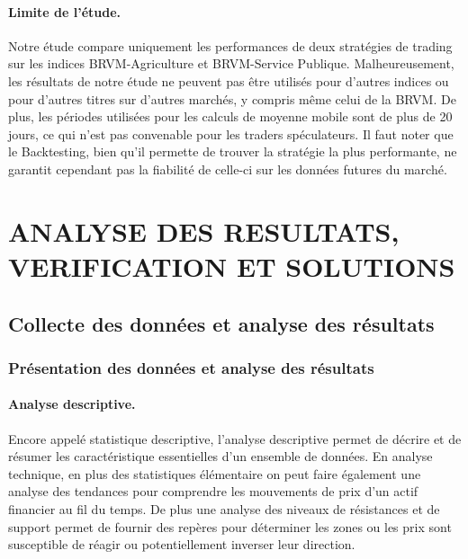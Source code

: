 \paragraph{\texorpdfstring{Limite de l'étude.
}{Limite de l'étude. }}\label{limite-de-luxe9tude.}

{Notre étude compare uniquement les performances de deux stratégies de
trading sur les indices BRVM-Agriculture et BRVM-Service Publique.
Malheureusement, les résultats de notre étude ne peuvent pas être
utilisés pour d'autres indices ou pour d'autres titres sur d'autres
marchés, y compris même celui de la BRVM. De plus, les périodes
utilisées pour les calculs de moyenne mobile sont de plus de 20 jours,
ce qui n'est pas convenable pour les traders spéculateurs. Il faut noter
que le Backtesting, bien qu'il permette de trouver la stratégie la plus
performante, ne garantit cependant pas la fiabilité de celle-ci sur les
données futures du marché.}

\section{ANALYSE DES RESULTATS, VERIFICATION ET
SOLUTIONS}\label{analyse-des-resultats-verification-et-solutions}

\subsection{Collecte des données et analyse des
résultats}\label{collecte-des-donnuxe9es-et-analyse-des-ruxe9sultats}

\subsubsection{Présentation des données et analyse des
résultats}\label{pruxe9sentation-des-donnuxe9es-et-analyse-des-ruxe9sultats}

\paragraph{Analyse descriptive.}\label{analyse-descriptive.}

{Encore appelé statistique descriptive, l'analyse descriptive permet de
décrire et de résumer les caractéristique essentielles d'un ensemble de
données. En analyse technique, en plus des statistiques élémentaire on
peut faire également une analyse des tendances pour comprendre les
mouvements de prix d'un actif financier au fil du temps. De plus une
analyse des niveaux de résistances et de support permet de fournir des
repères pour déterminer les zones ou les prix sont susceptible de réagir
ou potentiellement inverser leur direction.}

